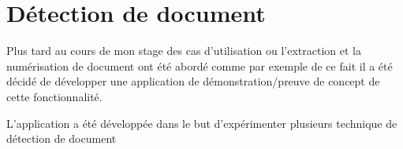 

\section{Détection de document}

Plus tard au cours de mon stage des cas d'utilisation ou l'extraction et la numérisation de document ont été abordé comme par exemple %
de ce fait il a été décidé de développer une application de démonstration/preuve de concept de cette fonctionnalité.

L'application a été développée dans le but d'expérimenter plusieurs technique de détection de document 

